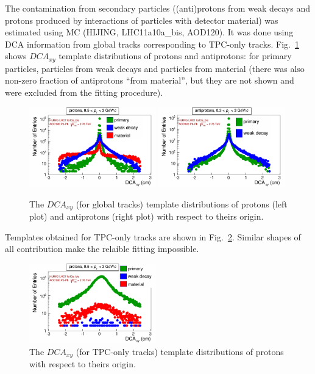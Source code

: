 The contamination from secondary particles ((anti)protons from weak decays and protons produced by interactions of particles with detector material) was estimated using MC (HIJING, LHC11a10a\_bis, AOD120). It was done using DCA information from global tracks corresponding to TPC-only tracks. Fig.~\ref{dcatemplates} shows $DCA_{xy}$ template distributions of protons and antiprotons: for primary particles, particles from weak decays and particles from material (there was also non-zero fraction of antiprotons ``from material'', but they are not shown and were excluded from the fitting procedure).
 \begin{figure}%
   \centering
   \includegraphics[width=0.49\textwidth]{DCAxyMC_hijing_PP}
   \includegraphics[width=0.49\textwidth]{DCAxyMC_hijing_APAP}
   \caption{The $DCA_{xy}$ (for global tracks) template distributions of protons (left plot) and antiprotons (right plot) with respect to theirs origin.}
   \label{dcatemplates}
 \end{figure}
Templates obtained for TPC-only tracks are shown in Fig.~\ref{dcatemplatestpconly}. Similar shapes of all contribution make the relaible fitting impossible.
 \begin{figure}%
   \centering
   \includegraphics[width=0.49\textwidth]{DCA_MCtemplates_tpconly}
   \caption{The $DCA_{xy}$ (for TPC-only tracks) template distributions of protons with respect to theirs origin.}
   \label{dcatemplatestpconly}
 \end{figure}

